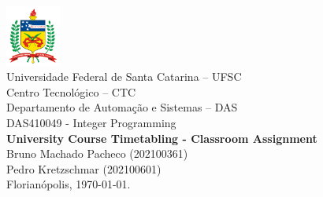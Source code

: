 \documentclass[a4paper,11pt]{article}
\begin{document}
	\thispagestyle{empty}
\begin{center}
	\includegraphics[height=2cm]{imagens/logoUFSCsimples.png} \\
	{\Large Universidade Federal de Santa Catarina -- UFSC} \\
	{\Large Centro Tecnológico -- CTC} \\
	{\Large Departamento de Automação e Sistemas -- DAS} \\
	\vspace{1cm}
	{\large DAS410049 - Integer Programming} \\
	\vfill
	\large{\textbf{University Course Timetabling - Classroom Assignment} \\
	} 
	\vspace{1cm}
    Bruno Machado Pacheco (202100361) \\
    Pedro Kretzschmar (202100601) \\
    \vfill
	Florianópolis, \today.
\end{center}

\clearpage

\tableofcontents

\clearpage



\FloatBarrier
\newpage


\FloatBarrier
\newpage


\FloatBarrier
\newpage


\FloatBarrier
\newpage


\FloatBarrier
\newpage


\newpage
\end{document}
